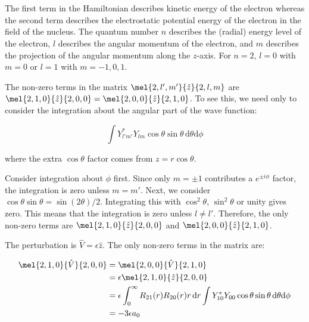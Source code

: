 \documentclass[12pt]{article}
\begin{document}



\pagebreak
\section*{}



The first term in the Hamiltonian describes kinetic energy of the electron whereas the second term describes the electrostatic potential energy of the electron in the field of the nucleus. The quantum number $n$ describes the (radial) energy level of the electron, $l$ describes the angular momentum of the electron, and $m$ describes the projection of the angular momentum along the $z$-axis. For $n = 2$, $l = 0$ with $m = 0$ or $l = 1$ with $m = -1, 0, 1$.

The non-zero terms in the matrix $\mel{2,l',m'}{\hat{z}}{2,l,m}$ are $\mel{2,1,0}{\hat{z}}{2,0,0} = \mel{2,0,0}{\hat{z}}{2,1,0}$. To see this, we need only to consider the integration about the angular part of the wave function:

\begin{equation}
    \int Y_{l'm'}^{*} Y_{lm} \cos{\theta} \sin{\theta} \, \mathrm{d}\theta \mathrm{d}\phi
\end{equation}

where the extra $\cos{\theta}$ factor comes from $z = r \cos{\theta}$.

Consider integration about $\phi$ first. Since only $m = \pm 1$ contributes a $e^{\pm i \phi}$ factor, the integration is zero unless $m = m'$. Next, we consider $\cos{\theta} \sin{\theta} = \sin{(2\theta)}/2$. Integrating this with $\cos^{2}{\theta}$, $\sin^{2}{\theta}$ or unity gives zero. This means that the integration is zero unless $l \ne l'$. Therefore, the only non-zero terms are $\mel{2,1,0}{\hat{z}}{2,0,0}$ and $\mel{2,0,0}{\hat{z}}{2,1,0}$.

The perturbation is $\hat{V} = \epsilon \hat{z}$. The only non-zero terms in the matrix are:

\begin{equation}
    \begin{split}
        \mel{2,1,0}{\hat{V}}{2,0,0} &= \mel{2,0,0}{\hat{V}}{2,1,0} \\
        &= \epsilon \mel{2,1,0}{\hat{z}}{2,0,0} \\
        &= \epsilon \int_{0}^{\infty} R_{21}(r) R_{20}(r) r \, \mathrm{d}r \int Y_{10}^{*} Y_{00} \cos{\theta} \sin{\theta} \, \mathrm{d}\theta \mathrm{d}\phi \\
        &= -3 \epsilon a_{0}
    \end{split}
\end{equation}
\end{document}
